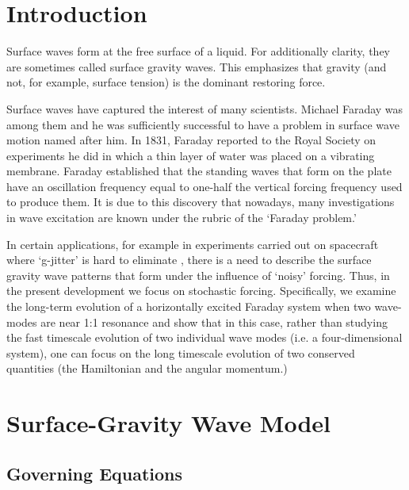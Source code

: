 \section{Introduction}

Surface waves form at the free surface of a liquid. For additionally clarity, they are sometimes called surface gravity waves. This emphasizes that gravity (and not, for example, surface tension) is the dominant restoring force.

Surface waves have captured the interest of many scientists. Michael Faraday was among them and he was sufficiently successful to have a problem in surface wave motion named after him. In 1831, Faraday reported to the Royal Society \citep{faraday31:_acous_figur} on experiments he did in which a thin layer of water was placed on a vibrating membrane. Faraday established that the standing waves that form on the plate have an oscillation frequency equal to one-half the vertical forcing frequency used to produce them. It is due to this discovery that nowadays, many investigations in wave excitation are known under the rubric of the `Faraday problem.'


In certain applications, for example in experiments carried out on spacecraft where `g-jitter' is hard to eliminate \citep{walter87:_fluid}, there is a need to describe the surface gravity wave patterns that form under the influence of `noisy' forcing. Thus, in the present development we focus on stochastic forcing. Specifically, we examine the long-term evolution of a horizontally excited Faraday system when two wave-modes are near 1:1 resonance and show that in this case, rather than studying the fast timescale evolution of two individual wave modes (i.e. a four-dimensional system), one can focus on the long timescale evolution of two conserved quantities (the Hamiltonian and the angular momentum.)

\section{Surface-Gravity Wave Model}
\subsection{Governing Equations}
\label{s:governing equations}

